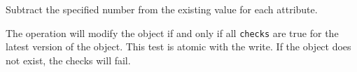 Subtract the specified number from the existing value for each attribute.

The operation will modify the object if and only if all \texttt{checks} are true
for the latest version of the object.  This test is atomic with the write.  If
the object does not exist, the checks will fail.




